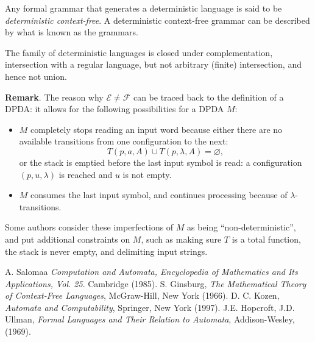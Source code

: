 \documentclass[12pt]{article}
\begin{document}
Any formal grammar that generates a deterministic language is said to be \emph{deterministic context-free}.  A deterministic context-free grammar can be described by what is known as the  grammars.

The family of deterministic languages is closed under complementation, intersection with a regular language, but not arbitrary (finite) intersection, and hence not union.

\textbf{Remark}.  The reason why $\mathscr{E}\ne \mathscr{F}$ can be traced back to the definition of a DPDA: it allows for the following possibilities for a DPDA $M$:
\begin{itemize}
\item $M$ completely stops reading an input word because either there are no available transitions from one configuration to the next: $$T(p,a,A)\cup T(p,\lambda,A)=\varnothing,$$ or the stack is emptied before the last input symbol is read: a configuration $(p,u,\lambda)$ is reached and $u$ is not empty.
\item $M$ consumes the last input symbol, and continues processing because of $\lambda$-transitions.
\end{itemize}
Some authors consider these imperfections of $M$ as being ``non-deterministic'', and put additional constraints on $M$, such as making sure $T$ is a total function, the stack is never empty, and delimiting input strings.

\begin{thebibliography}{9}
 A. Salomaa {\em Computation and Automata, Encyclopedia of Mathematics and Its Applications, Vol. 25}. Cambridge (1985).
 S. Ginsburg, {\em The Mathematical Theory of Context-Free Languages}, McGraw-Hill, New York (1966).
 D. C. Kozen, {\em Automata and Computability}, Springer, New York (1997).
 J.E. Hopcroft, J.D. Ullman, {\em Formal Languages and Their Relation to Automata}, Addison-Wesley, (1969).
\end{thebibliography}
\end{document}

